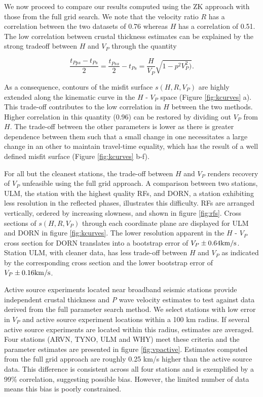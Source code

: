 \documentclass[review]{elsarticle}
\begin{document}
We now proceed to compare our results computed using the ZK approach with those from the full grid search. We note that the velocity ratio $R$ has a correlation between the two datasets of 0.76 whereas $H$ has a correlation of 0.51. The low correlation between crustal thickness estimates can be explained by the strong tradeoff between $H$ and $V_P$ through the quantity

$$\frac{t_{Pps}-t_{Ps}}{2}=\frac{t_{Pss}}{2} - t_{Ps}= \frac{H}{V_P}\sqrt{1-p^2V^2_P)}.$$

\noindent As a consequence, contours of the misfit surface $s(H,R,V_P)$ are highly extended along the kinematic curve in the $H$ - $V_P$ space (Figure \ref{fig:kcurves} a). This trade-off contributes to the low correlation in $H$ between the two methods. Higher correlation in this quantity (0.96) can be restored by dividing out $V_P$ from $H$. The trade-off between the other parameters is lower as there is greater dependence between them such that a small change in one necessitates a large change in an other to maintain travel-time equality, which has the result of a well defined misfit surface (Figure \ref{fig:kcurves} b-f).

For all but the cleanest stations, the trade-off between $H$ and $V_P$ renders recovery of $V_P$ unfeasible using the full grid approach. A comparison between two stations, ULM, the station with the highest quality RFs, and DORN, a station exhibiting less resolution in the reflected phases, illustrates this difficulty. RFs are arranged vertically, ordered by increasing slowness, and shown in figure \ref{fig:rfs}. Cross sections of $s(H,R,V_P)$ through each coordinate plane are displayed for ULM and DORN in figure \ref{fig:kcurves}. The lower resolution apparent in the $H$ - $V_P$ cross section for DORN translates into a bootstrap error of $V_P \pm 0.64 {\rm km/s}$. Station ULM, with cleaner data, has less trade-off between $H$ and $V_P$ as indicated by the corresponding cross section and the lower bootstrap error of $V_P \pm 0.16 {\rm km/s}$.

Active source experiments located near broadband seismic stations provide independent crustal thickness and {\it P} wave velocity estimates to test against data derived from the full parameter search method. We select stations with low error in $V_P$ and active source experiment locations within a 100 km radius. If several active source experiments are located within this radius, estimates are averaged. Four stations (ARVN, TYNO, ULM and WHY) meet these criteria and the parameter estimates are presented in figure \ref{fig:vpactive}. Estimates computed from the full grid approach are roughly 0.25 km/s higher than the active source data. This difference is consistent across all four stations and is exemplified by a 99\% correlation, suggesting possible bias. However, the limited number of data means this bias is poorly constrained.
\end{document}
